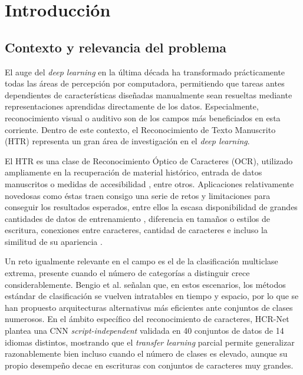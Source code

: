\documentclass[conference]{IEEEtran}
\begin{document}
\section{Introducción}

\subsection{Contexto y relevancia del problema}
El auge del \textit{deep learning} en la última década ha transformado prácticamente todas las áreas de percepción por computadora, permitiendo que tareas antes dependientes de características diseñadas manualmente sean resueltas mediante representaciones aprendidas directamente de los datos. Especialmente, reconocimiento visual o auditivo son de los campos más beneficiados en esta corriente. Dentro de este contexto, el Reconocimiento de Texto Manuscrito (HTR) representa un gran área de investigación en el \textit{deep learning}.

El HTR es una clase de  Reconocimiento Óptico de Caracteres (OCR), utilizado ampliamente en la recuperación de material histórico, entrada de datos manuscritos o medidas de accesibilidad \cite{garrido-munoz_handwritten_2026}, entre otros. Aplicaciones relativamente novedosas como éstas traen consigo una serie de retos y limitaciones para conseguir los resultados esperados, entre ellos la escasa disponibilidad de grandes cantidades de datos de entrenamiento \cite{chang_data_2022}, diferencia en tamaños o estilos de escritura, conexiones entre caracteres, cantidad de caracteres e incluso la similitud de su apariencia \cite{bangla_cnn_2015}.

Un reto igualmente relevante en el campo es el de la clasificación
multiclase extrema, presente cuando el número de categorías a distinguir
crece considerablemente. Bengio et al. \cite{bengio_extreme_2019} señalan que, en estos escenarios, los métodos estándar de clasificación se vuelven intratables en tiempo y espacio, por lo que se han propuesto arquitecturas alternativas más eficientes ante conjuntos de clases numerosos. En el ámbito específico del reconocimiento de caracteres, HCR-Net \cite{hcrnet_2024} plantea una CNN \textit{script-independent} validada en 40 conjuntos de datos de 14 idiomas distintos, mostrando que el \textit{transfer learning} parcial permite generalizar razonablemente bien incluso cuando el número de clases es elevado, aunque su propio desempeño decae en escrituras con conjuntos de caracteres muy grandes.
\end{document}
